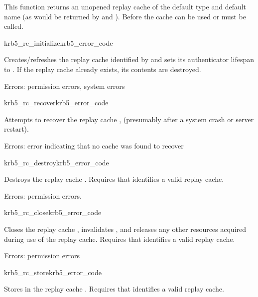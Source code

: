 This function returns an unopened replay cache of the default type and
default name (as would be returned by 
and ).  Before the cache can be used
 or  must be
called.


\begin{funcdecl}{krb5_rc_initialize}{krb5_error_code}{\funcin}
\end{funcdecl}

Creates/refreshes the replay cache identified by  and sets its
authenticator lifespan to .  If the 
replay cache already exists, its contents are destroyed.

Errors: permission errors, system errors

\begin{funcdecl}{krb5_rc_recover}{krb5_error_code}{\funcin}
\end{funcdecl}
Attempts to recover the replay cache , (presumably after a
system crash or server restart).

Errors: error indicating that no cache was found to recover

\begin{funcdecl}{krb5_rc_destroy}{krb5_error_code}{\funcin}
\end{funcdecl}

Destroys the replay cache .
Requires that  identifies a valid replay cache.

Errors: permission errors.

\begin{funcdecl}{krb5_rc_close}{krb5_error_code}{\funcin}
\end{funcdecl}

Closes the replay cache , invalidates ,
and releases any other resources acquired during use of the replay cache.
Requires that  identifies a valid replay cache.

Errors: permission errors

\begin{funcdecl}{krb5_rc_store}{krb5_error_code}{\funcin}
\end{funcdecl}
Stores  in the replay cache .
Requires that  identifies a valid replay cache.

